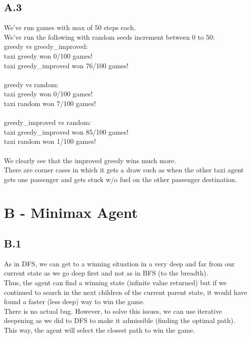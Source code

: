 \documentclass[12pt]{article}
\begin{document}
\subsection*{A.3}
We've run games with max of 50 steps each.\\
We've run the following with random seeds increment between 0 to 50:\\
greedy vs greedy\_improved:\\
taxi greedy won 0/100 games!\\
taxi greedy\_improved won 76/100 games!\\
\\
greedy vs random:\\
taxi greedy won 0/100 games!\\
taxi random won 7/100 games!\\
\\
greedy\_improved vs random:\\
taxi greedy\_improved won 85/100 games!\\
taxi random won 1/100 games!\\
\\
We clearly see that the improved greedy wins much more.\\
There are corner cases in which it gets a draw such as when the other taxi agent gets one passenger and gets stuck w/o fuel on the other passenger destination.

\section*{B - Minimax Agent}

\subsection*{B.1}
As in DFS, we can get to a winning situation in a very deep and far from our current state as we go deep first and not as in BFS (to the breadth).\\
Thus, the agent can find a winning state (infinite value returned) but if we  continued to search in the next children of the current parent state, it would have found a faster (less deep) way to win the game.\\
There is no actual bug. However, to solve this issues, we can use iterative deepening as we did to DFS to make it admissible (finding the optimal path). This way, the agent will select the closest path to win the game.\\
\end{document}
